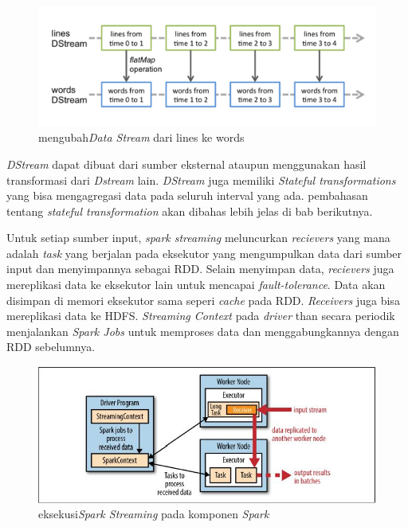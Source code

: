 \documentclass[a4paper,twoside]{article}
\begin{document}
\begin{enumerate}
		\begin{figure}[H] 
		\centering  
		\includegraphics[scale=0.7]{streaming-dstream-ops}  
		\caption[Gambar mengubah{\it Data Stream} dari lines ke words]{mengubah{\it Data Stream} 				dari lines ke words} 
		\label{fig:processing-events relationship} 
		\end{figure}
	
		\textit{DStream} dapat dibuat dari sumber eksternal ataupun menggunakan hasil transformasi 				dari \textit{Dstream} lain. \textit{DStream} juga memiliki  \textit{Stateful 							transformations} yang bisa mengagregasi data pada seluruh interval yang ada. pembahasan 				tentang \textit{stateful transformation} akan dibahas lebih jelas di bab berikutnya.

		Untuk setiap sumber input, \textit{spark streaming} meluncurkan \textit{recievers} yang mana 		adalah \textit{task} yang berjalan pada eksekutor yang mengumpulkan data dari sumber input 				dan menyimpannya sebagai RDD. Selain menyimpan data, \textit{recievers} juga mereplikasi 				data ke eksekutor lain untuk mencapai \textit{fault-tolerance}. Data akan disimpan di memori 		eksekutor sama seperi \textit{cache} pada RDD. \textit{Receivers} juga bisa mereplikasi data 		ke HDFS. \textit{Streaming Context} pada \textit{driver} than secara periodik menjalankan 				\textit{Spark Jobs} untuk memproses data dan menggabungkannya dengan RDD sebelumnya.
  
		\begin{figure}[H] 
		\centering  
		\includegraphics[scale=1]{spark-streaming-execution}  
		\caption[Gambar eksekusi{\it Spark Streaming} pada komponen \textit{Spark}]{eksekusi{\it 				Spark Streaming} pada komponen \textit{Spark}} 
		\label{fig:processing-events relationship} 
		\end{figure}


\end{enumerate}
\end{document}
